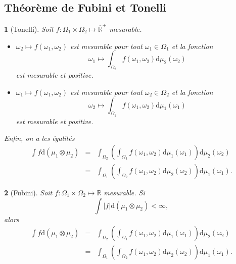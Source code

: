 \documentclass[8pt,notheorems]{beamer}
\def \R{\mathbb{R}}
\def \Om{\Omega}
\def \om{\omega}
\newtheorem{theorem}{\translate{Theorem}}[section]
\newtheorem{theorem}{\translate{Theoreme}}
\theoremstyle{definition}
\theoremstyle{example}
\theoremstyle{mystyle}
\theoremstyle{plain}
\begin{document}
\subsection{Théorème de Fubini et Tonelli}
\begin{frame}[allowframebreaks]
\begin{theorem}[Tonelli]
Soit $f:\Om_1\times\Om_2\mapsto\overline{\R}^{+}$ mesurable.
\begin{itemize}
\item $\om_2\mapsto f(\om_1,\om_2)$ est mesurable pour tout $\om_1\in\Om_1$ et la fonction
$$
\om_1\mapsto \int_{\Om_2}f(\om_1,\om_2)\text{d}\mu_2(\om_2)
$$
est mesurable et positive.
\item $\om_1\mapsto f(\om_1,\om_2)$ est mesurable pour tout $\om_2\in\Om_2$ et la fonction
$$
\om_2\mapsto \int_{\Om_1}f(\om_1,\om_2)\text{d}\mu_1(\om_1)
$$
est mesurable et positive.
\end{itemize}
Enfin, on a les égalités
\begin{eqnarray*}
\int f\text{d}(\mu_1\otimes\mu_2)&=&\int_{\Om_2}\left(\int_{\Om_1}f(\om_1,\om_2)\text{d}\mu_1(\om_1)\right)\text{d}\mu_2(\om_2)\\
&=&\int_{\Om_1}\left(\int_{\Om_2}f(\om_1,\om_2)\text{d}\mu_2(\om_2)\right)\text{d}\mu_1(\om_1).
\end{eqnarray*}
\end{theorem}
\begin{theorem}[Fubini]
Soit $f:\Om_1\times\Om_2\mapsto \R$ mesurable. Si
$$
\int |f|\text{d}(\mu_1\otimes\mu_2)<\infty
,$$
alors
\begin{eqnarray*}
\int f\text{d}(\mu_1\otimes\mu_2)&=&\int_{\Om_2}\left(\int_{\Om_1}f(\om_1,\om_2)\text{d}\mu_1(\om_1)\right)\text{d}\mu_2(\om_2)\\
&=&\int_{\Om_1}\left(\int_{\Om_2}f(\om_1,\om_2)\text{d}\mu_2(\om_2)\right)\text{d}\mu_1(\om_1).
\end{eqnarray*}
\end{theorem}
\end{frame}
\end{document}
